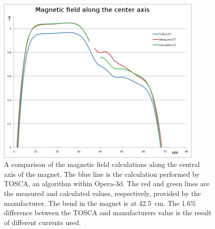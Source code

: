 \documentclass[oneside,12pt]{memoir}
\begin{document}
\begin{figure}[t]
	\includegraphics[width=0.9\textwidth]{magnet_field_comp.png}
	\caption[Comparison of magnetic field calculations]{A comparison of the magnetic field calculations along the central axis of the magnet. The blue line is the calculation performed by TOSCA, an algorithm within Opera-3d. The red and green lines are the measured and calculated values, respectively, provided by the manufacturer. The bend in the magnet is at 42.5~cm. The 1.6\% difference between the TOSCA and manufacturers value is the result of different currents used.}
	\label{fig:mag_field_comp}
\end{figure}
\end{document}
